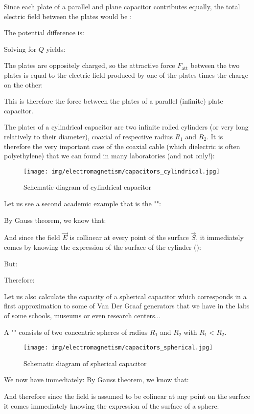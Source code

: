 	Since each plate of a parallel and plane capacitor contributes equally, the total electric field between the plates would be :
	
	The potential difference is:
	
	Solving for $Q$ yields:
	
	The plates are oppositely charged, so the attractive force $F_\text{att}$ between the two plates is equal to the electric field produced by one of the plates times the charge on the other:
	 
	This is therefore the force between the plates of a parallel (infinite) plate capacitor.
	
	The plates of a cylindrical capacitor are two infinite rolled cylinders (or very long relatively to their diameter), coaxial of respective radius $R_1$ and $R_2$. It is therefore the very important case of the coaxial cable (which dielectric is often polyethylene) that we can found in many laboratories (and not only!):
	\begin{figure}[H]
		\centering
		\texttt{[image: img/electromagnetism/capacitors\_cylindrical.jpg]}
		\caption{Schematic diagram of cylindrical capacitor}
	\end{figure}
	Let us see a second academic example that is the "":

	By Gauss theorem, we know that:
	
	And since the field $\vec{E}$ is collinear at every point of the surface $\vec{S}$, it immediately comes by knowing the expression of the surface of the cylinder ():
	
	But:
	
	Therefore:
	
	
	Let us also calculate the capacity of a spherical capacitor which corresponds in a first approximation to some of Van Der Graaf generators that we have in the labs of some schools, museums or even research centers...
	
	A "" consists of two concentric spheres of radius $R_1$ and $R_2$ with $R_1<R_2$.
	\begin{figure}[H]
		\centering
		\texttt{[image: img/electromagnetism/capacitors\_spherical.jpg]}
		\caption{Schematic diagram of spherical capacitor}
	\end{figure}
	We now have immediately:
	By Gauss theorem, we know that:
	
	And therefore since the field is assumed to be colinear at any point on the surface it comes immediately knowing the expression of the surface of a sphere:
	
